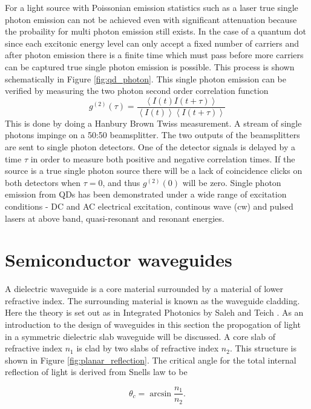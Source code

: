 For a light source with Poissonian emission statistics such as a laser true
single photon emission can not be achieved even with significant attenuation
because the probaility for multi photon emission still exists. In the case of a
quantum dot since each excitonic energy level can only accept a fixed number of
carriers and after photon emission there is a finite time which must pass before
more carriers can be captured true single photon emission is possible. This
process is shown schematically in Figure \ref{fig:qd_photon}. This single photon
emission can be verified by measuring the two photon second order correlation
function \begin{equation} g^{(2)}(\tau) = \frac{\left\langle I(t)I(t+\tau)
\right\rangle}{\left\langle I(t) \right\rangle \left\langle I(t+\tau)
\right\rangle} \end{equation} This is done by doing a Hanbury Brown Twiss
measurement. A stream of single photons impinge on a 50:50 beamsplitter. The two
outputs of the beamsplitters are sent to single photon detectors. One of the
detector signals is delayed by a time $\tau$ in order to measure both positive
and negative correlation times. If the source is a true single photon source
there will be a lack of coincidence clicks on both detectors when $\tau = 0$,
and thus $g^{(2)}(0)$ will be zero. Single photon emission from QDs has been
demonstrated under a wide range of excitation conditions - DC and AC electrical
excitation, continous wave (cw) and pulsed lasers at above band, quasi-resonant
and resonant energies.

\section{Semiconductor waveguides}

A dielectric waveguide is a core material surrounded by a material of lower
refractive index. The surrounding material is known as the waveguide cladding.
Here the theory is set out as in Integrated Photonics by Saleh and Teich
\cite{saleh1991fundamentals}. As an introduction to the design of waveguides in
this section the propogation of light in a symmetric dielectric slab waveguide
will be discussed. A core slab of refractive index $n_1$ is clad by two slabs of
refractive index $n_2$. This structure is shown in Figure
\ref{fig:planar_reflection}. The critical angle for the total internal
reflection of light is derived from Snells law to be

\begin{equation} \theta_c = \arcsin{\frac{n_1}{n_2}}. \end{equation}

